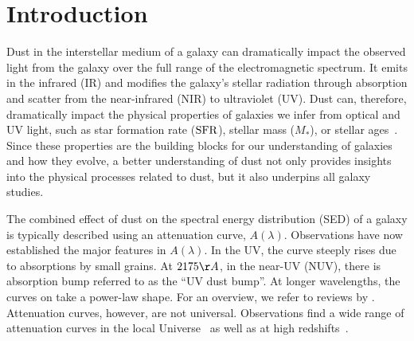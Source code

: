\section{Introduction} \label{sec:intro} 
Dust in the interstellar medium of a galaxy can dramatically impact the
observed light from the galaxy over the full range of the electromagnetic spectrum. 
It emits in the infrared (IR) and modifies the galaxy's stellar radiation
through absorption and scatter from the near-infrared (NIR) to ultraviolet
(UV). Dust can, therefore, dramatically impact the physical properties of
galaxies we infer from optical and UV light, such as star
formation rate (${\rm SFR}$), stellar mass ($M_*$), or stellar ages~\citep[see
reviews by][]{walcher2011, conroy2013}. Since these properties are the
building blocks for our understanding of galaxies and how they evolve,
a better understanding of dust not only provides insights into the physical
processes related to dust, but it also underpins all galaxy studies.  

The combined effect of dust on the spectral energy distribution (SED) of a
galaxy is typically described using an attenuation curve, $A(\lambda)$.
Observations have now established the major features in $A(\lambda)$. In the UV, the 
curve steeply rises due to absorptions by small grains. At $2175\AA$, in the 
near-UV (NUV), there is absorption bump referred to as the ``UV dust bump''. 
At longer wavelengths, the curves on take a power-law shape. For an overview, we 
refer to reviews by \cite{calzetti2001, draine2003, galliano2018}. Attenuation
curves, however, are not universal. Observations find a wide range of
attenuation curves in the local Universe~\citep{wild2011, battisti2017,
salim2018, salim2020} as well as at high redshifts~\citep[\eg][]{reddy2015,
salmon2016}.

